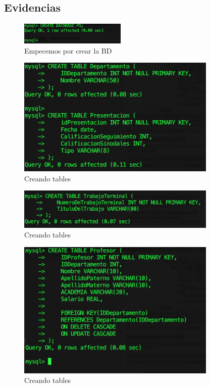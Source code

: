 \documentclass[12pt, fleqn]{article}                             %
\begin{document}
    \subsection{Evidencias}

        \begin{figure}[h]
            \centering
            \includegraphics[width=0.45\textwidth]{BD1Reporte0}
            \caption{Empecemos por crear la BD}
        \end{figure}

        \begin{figure}[h]
            \centering
            \includegraphics[width=0.85\textwidth]{BD1Reporte1}
            \caption{Creando tables}
        \end{figure}

        \begin{figure}[h]
            \centering
            \includegraphics[width=0.85\textwidth]{BD1Reporte2}
            \caption{Creando tables}
        \end{figure}

        \begin{figure}[h]
            \centering
            \includegraphics[width=0.85\textwidth]{BD1Reporte3}
            \caption{Creando tables}
        \end{figure}
\end{document}
